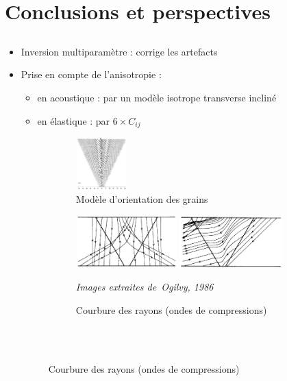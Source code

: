 \documentclass[10pt,xcolor=x11names,compress, notes=show]{beamer}%
\begin{document}
\begin{frame}{\insertsectionhead}
\begin{itemize}
	\end{itemize}
		
\end{frame}


\section{Conclusions et perspectives}
\subsection*{}
\begin{frame}{\insertsectionhead}
\setlength{\leftmargin}{-1cm}
\setlength{\rightmargin}{-1cm}

	\begin{itemize}
		\item<1-> Inversion multiparamètre : corrige les artefacts
		\item<2-> Prise en compte de l'anisotropie : 
		\begin{itemize}
			\item en acoustique : par un modèle isotrope transverse incliné
			\item en élastique : par $6\times C_{ij}$
		\end{itemize} 
		\begin{figure}[!h]
		    \centering
		    \hspace{-1cm}\begin{subfigure}[b]{0.25\textwidth}
		    	\centering
		 		\includegraphics[height=2cm]{img/ogilvy_model.png}
		 		\vspace{0.2cm}\caption{\centering \scriptsize Modèle d'orientation des grains}
			\end{subfigure}
			\begin{subfigure}[b]{0.7\textwidth}
				\centering
		 		\includegraphics[height=2cm]{img/ogilvy_ray1.png}
		 		\includegraphics[height=2cm]{img/ogilvy_ray2.png}\\
		 		\raggedright{\vspace{-0.25cm}\tiny{\itshape Images extraites de~Ogilvy, 1986}}
		 		\caption{\scriptsize Courbure des rayons (ondes de compressions) \\~}
			\end{subfigure}\\
				

\end{figure}
\end{itemize}
\end{frame}
\end{document}
